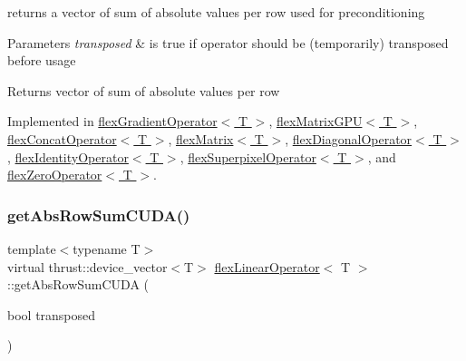 returns a vector of sum of absolute values per row used for preconditioning 


\begin{DoxyParams}{Parameters}
{\em transposed} & is true if operator should be (temporarily) transposed before usage \\
\hline
\end{DoxyParams}
\begin{DoxyReturn}{Returns}
vector of sum of absolute values per row 
\end{DoxyReturn}


Implemented in \hyperlink{classflex_gradient_operator_a04950a1e57f7587b95824bfd82b35738}{flex\+Gradient\+Operator$<$ T $>$}, \hyperlink{classflex_matrix_g_p_u_a0a1f19c482243223b8d98165d0b44ccf}{flex\+Matrix\+G\+P\+U$<$ T $>$}, \hyperlink{classflex_concat_operator_a6cae0c9545cf1afd8ac0ebc418fa3327}{flex\+Concat\+Operator$<$ T $>$}, \hyperlink{classflex_matrix_a75f378787fc81ea2c570c9848a7f2588}{flex\+Matrix$<$ T $>$}, \hyperlink{classflex_diagonal_operator_ad53cb526b55141a1d0519a023572cf58}{flex\+Diagonal\+Operator$<$ T $>$}, \hyperlink{classflex_identity_operator_afe7f2f91fc5f563c2261937f272c0255}{flex\+Identity\+Operator$<$ T $>$}, \hyperlink{classflex_superpixel_operator_afd3f55401eaa6fb3e8a62c7f83443a4d}{flex\+Superpixel\+Operator$<$ T $>$}, and \hyperlink{classflex_zero_operator_a4c9fbbcd1961590e2fabef75197f4367}{flex\+Zero\+Operator$<$ T $>$}.

\mbox{\label{classflex_linear_operator_a0a0a431d43f4f9d36cbee0d31ba5a29b}} 
\subsubsection{\texorpdfstring{get\+Abs\+Row\+Sum\+C\+U\+D\+A()}{getAbsRowSumCUDA()}}
{\footnotesize\ttfamily template$<$typename T$>$ \\
virtual thrust\+::device\+\_\+vector$<$T$>$ \hyperlink{classflex_linear_operator}{flex\+Linear\+Operator}$<$ T $>$\+::get\+Abs\+Row\+Sum\+C\+U\+DA (\begin{DoxyParamCaption}\item[{bool}]{transposed }\end{DoxyParamCaption})\hspace{0.3cm}{\ttfamily [pure virtual]}}



